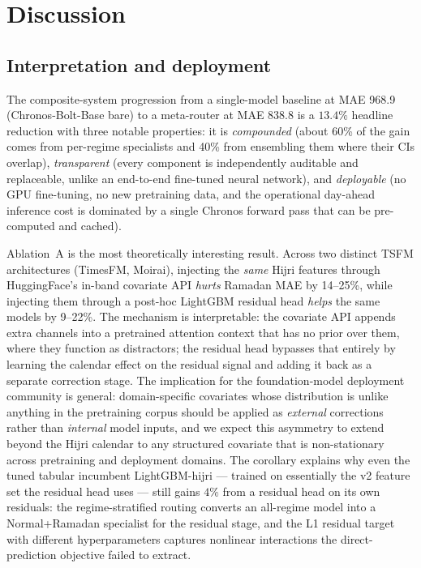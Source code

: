 \documentclass[10pt, a4paper, twocolumn]{article}
\begin{document}
\section{Discussion}
\label{sec:discussion}

\subsection{Interpretation and deployment}

The composite-system progression from a single-model baseline at
MAE \num{968.9} (Chronos-Bolt-Base bare) to a meta-router at MAE
\num{838.8} is a $13.4\%$ headline reduction with three notable
properties: it is \emph{compounded} (about 60\% of the gain comes
from per-regime specialists and 40\% from ensembling them where
their CIs overlap), \emph{transparent} (every component is
independently auditable and replaceable, unlike an end-to-end
fine-tuned neural network), and \emph{deployable} (no GPU
fine-tuning, no new pretraining data, and the operational
day-ahead inference cost is dominated by a single Chronos forward
pass that can be pre-computed and cached).

Ablation~A is the most theoretically interesting result. Across
two distinct TSFM architectures (TimesFM, Moirai), injecting the
\emph{same} Hijri features through HuggingFace's in-band covariate
API \emph{hurts} Ramadan MAE by 14--25\%, while injecting them
through a post-hoc LightGBM residual head \emph{helps} the same
models by 9--22\%. The mechanism is interpretable: the covariate
API appends extra channels into a pretrained attention context
that has no prior over them, where they function as distractors;
the residual head bypasses that entirely by learning the calendar
effect on the residual signal and adding it back as a separate
correction stage. The implication for the foundation-model
deployment community is general: domain-specific covariates whose
distribution is unlike anything in the pretraining corpus should
be applied as \emph{external} corrections rather than
\emph{internal} model inputs, and we expect this asymmetry to
extend beyond the Hijri calendar to any structured covariate
that is non-stationary across pretraining and deployment domains.
The corollary explains why even the tuned tabular incumbent
LightGBM-hijri --- trained on essentially the v2 feature set the
residual head uses --- still gains $4\%$ from a residual head on
its own residuals: the regime-stratified routing converts an
all-regime model into a Normal+Ramadan specialist for the residual
stage, and the L1 residual target with different hyperparameters
captures nonlinear interactions the direct-prediction objective
failed to extract.
\end{document}
